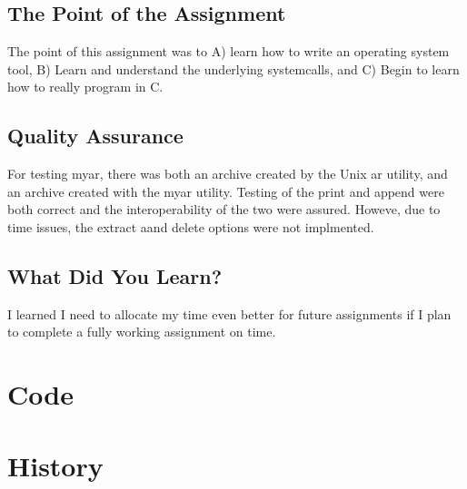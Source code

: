 \documentclass[letterpaper,10pt,titlepage]{article}
\begin{document}
\subsection{The Point of the Assignment}
\label{Point}
The point of this assignment was to A) learn how to write an operating system tool, B) Learn and understand the underlying systemcalls, and C) Begin to learn how to really program in C.
\subsection{Quality Assurance}
\label{QA}
For testing myar, there was both an archive created by the Unix ar utility, and an archive created with the myar utility. Testing of the print and append were both correct and the interoperability of the two were assured. Howeve, due to time issues, the extract aand delete options were not implmented.
\subsection{What Did You Learn?}
\label{Learned}
I learned I need to allocate my time even better for future assignments if I plan to complete a fully working assignment on time.


\section{Code}
\label{myar Source Code}

\section{History}
\end{document}
